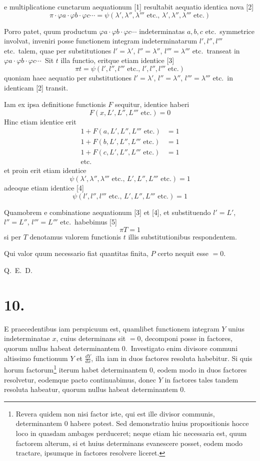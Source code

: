\documentclass[12pt,a4paper]{article}
\theoremstyle{plain}
\begin{document}
e multiplicatione cunctarum aequationum [1] resultabit aequatio identica nova [2]
\[
\pi \cdot \varphi a \cdot \varphi b \cdot \varphi c \cdots = \psi(\lambda', \lambda'', \lambda''' \text{ etc., } \lambda', \lambda'', \lambda''' \text{ etc.})
\]

Porro patet, quum productum $\varphi a \cdot \varphi b \cdot \varphi c \cdots$ indeterminatas $a, b, c$ etc.\ symmetrice involvat, inveniri posse functionem integram indeterminatarum
$l', l'', l'''$ etc.\ talem, quae per substitutiones $l' = \lambda'$, $l'' = \lambda''$, $l''' = \lambda'''$ etc.\ transeat
in $\varphi a \cdot \varphi b \cdot \varphi c \cdots$\ Sit $t$ illa functio, eritque etiam identice [3]
\[
\pi t = \psi(l', l'', l''' \text{ etc., } l', l'', l''' \text{ etc.})
\]
quoniam haec aequatio per substitutiones $l' = \lambda'$, $l'' = \lambda''$, $l''' = \lambda'''$ etc.\ in identicam [2] transit.

Iam ex ipsa definitione functionis $F$ sequitur, identice haberi
\[
F(x, L', L'', L''' \text{ etc.}) = 0
\]
Hinc etiam identice erit
\begin{align*}
1 + F(a, L', L'', L''' \text{ etc.}) &= 1 \\
1 + F(b, L', L'', L''' \text{ etc.}) &= 1 \\
1 + F(c, L', L'', L''' \text{ etc.}) &= 1 \\
\text{etc.}
\end{align*}
et proin erit etiam identice
\[
\psi(\lambda', \lambda'', \lambda''' \text{ etc., } L', L'', L''' \text{ etc.}) = 1
\]
adeoque etiam identice [4]
\[
\psi(l', l'', l''' \text{ etc., } L', L'', L''' \text{ etc.}) = 1
\]

Quamobrem e combinatione aequationum [3] et [4], et substituendo $l' = L'$,
$l'' = L''$, $l''' = L'''$ etc.\ habebimus [5]
\[
\pi T = 1
\]
si per $T$ denotamus valorem functionis $t$ illis substitutionibus respondentem.

Qui valor quum necessario fiat quantitas finita, $P$ certo nequit esse $= 0$.

\hfill Q.\ E.\ D.

\section*{10.}

E praecedentibus iam perspicuum est, quamlibet functionem integram $Y$
unius indeterminatae $x$, cuius determinans sit $= 0$,
decomponi posse in factores, quorum nullus habeat determinantem $0$.\ Investigato enim divisore communi
altissimo functionum $Y$ et $\frac{dY}{dx}$, illa iam in duos factores resoluta habebitur.
Si quis horum factorum\footnote{Revera quidem non nisi factor iste, qui est ille divisor communis, determinantem $0$ habere potest.
Sed demonstratio huius propositionis hocce loco in quasdam ambages perduceret; neque etiam hic necessaria
est, quum factorem alterum, si et huius determinans evanescere posset, eodem modo tractare, ipsumque in
factores resolvere liceret.} iterum habet determinantem $0$, eodem modo in duos factores resolvetur, eodemque pacto continuabimus, donec $Y$ in factores tales tandem
resoluta habeatur, quorum nullus habeat determinantem $0$.
\end{document}
